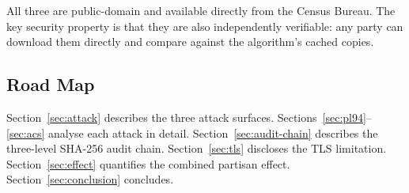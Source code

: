 All three are public-domain and available directly from the Census Bureau.
The key security property is that they are also independently verifiable:
any party can download them directly and compare against the algorithm's
cached copies.

\subsection{Road Map}

Section~\ref{sec:attack} describes the three attack surfaces.
Sections~\ref{sec:pl94}--\ref{sec:acs} analyse each attack in detail.
Section~\ref{sec:audit-chain} describes the three-level SHA-256 audit chain.
Section~\ref{sec:tls} discloses the TLS limitation.
Section~\ref{sec:effect} quantifies the combined partisan effect.
Section~\ref{sec:conclusion} concludes.
